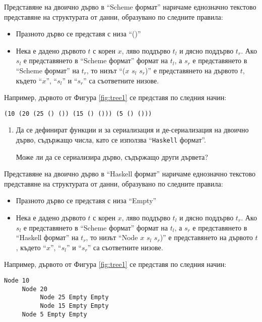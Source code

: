 \begin{mdframed}[hidealllines=true,backgroundcolor=gray!20]
Представяне на двоично дърво в ``Scheme формат'' наричаме еднозначно текстово представяне на структурата от данни, образувано по следните правила:
\begin{itemize}
  \item Празното дърво се представя с низа ``()''
  \item Нека е дадено дървото $t$ с корен $x$, ляво поддърво $t_l$ и дясно поддърво $t_r$. Ако $s_l$ е представянето в ``Scheme формат'' формат на $t_l$, а $s_r$ е представянето в ``Scheme формат'' на $t_r$, то низът ``($x$ $s_l$ $s_r$)'' е представянето на дървото $t$, където ``$x$'', ``$s_l$'' и ``$s_r$'' са съответните низове.

\end{itemize}
Например, дървото от Фигура \ref{fig:tree1} се представя по следния начин:

\begin{verbatim}
(10 (20 (25 () ()) (15 () ())) (5 () ()))
\end{verbatim}

\end{mdframed}


\begin{enumerate}[resume]
\item Да се дефинират функции  и  за сериализация и де-сериализация на двоично дърво, съдържащо числа, като се използва ``\texttt{Haskell} формат''.
  
Може ли да се сериализира дърво, съдържащо други дървета?
\end{enumerate}

\begin{mdframed}[hidealllines=true,backgroundcolor=gray!20]
Представяне на двоично дърво в ``Haskell формат'' наричаме еднозначно текстово представяне на структурата от данни, образувано по следните правила:
\begin{itemize}
\item Празното дърво се представя с низа ``Empty''
\item Нека е дадено дървото $t$ с корен $x$, ляво поддърво $t_l$ и дясно поддърво $t_r$. Ако $s_l$ е представянето в ``Scheme формат'' формат на $t_l$, а $s_r$ е представянето в ``Haskell формат'' на $t_r$, то низът ``Node $x$ $s_l$ $s_r$)'' е представянето на дървото $t$, където ``$x$'', ``$s_l$'' и ``$s_r$'' са съответните низове.

\end{itemize}
Например, дървото от Фигура \ref{fig:tree1} се представя по следния начин:

\begin{verbatim}
Node 10 
     Node 20
          Node 25 Empty Empty
          Node 15 Empty Empty
     Node 5 Empty Empty
\end{verbatim}

\end{mdframed}


